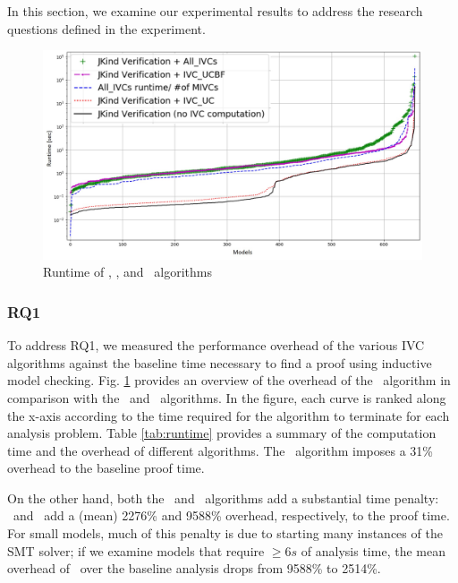 \label{sec:results}

In this section, we examine our
experimental results to address the research questions defined in the experiment.

\begin{figure}
 \centering
  \includegraphics[width=\columnwidth]{figs/performance.jpg}
  \vspace{-0.1in}
  \caption{Runtime of \aivcalg, \ucbfalg, and \ucalg ~algorithms}
  \label{fig:performance}
\end{figure}


\subsubsection{RQ1}

To address RQ1, we measured the performance overhead of the various IVC algorithms against the baseline time
necessary to find a proof using inductive model checking. Fig. \ref{fig:performance} provides an overview of the  overhead of the \aivcalg ~algorithm in comparison with the \ucalg ~and \ucbfalg\ algorithms.  In the figure, each curve is ranked along the x-axis according to the time required for the algorithm to terminate for each analysis problem.
Table \ref{tab:runtime} provides a summary of the computation time and the overhead of different algorithms.  The \ucalg\ algorithm imposes a  31\% overhead to the baseline proof time.


On the other hand, both the \ucbfalg\ and \aivcalg\ algorithms add a substantial time penalty: \ucbfalg\ and \aivcalg\ add a (mean) 2276\% and 9588\% overhead, respectively, to the proof time.
For small models, much of this penalty is due to starting many instances of the SMT solver; if we examine models that require $\geq6s$ of analysis time, the mean overhead of \aivcalg\ over the baseline analysis drops from 9588\% to 2514\%.

